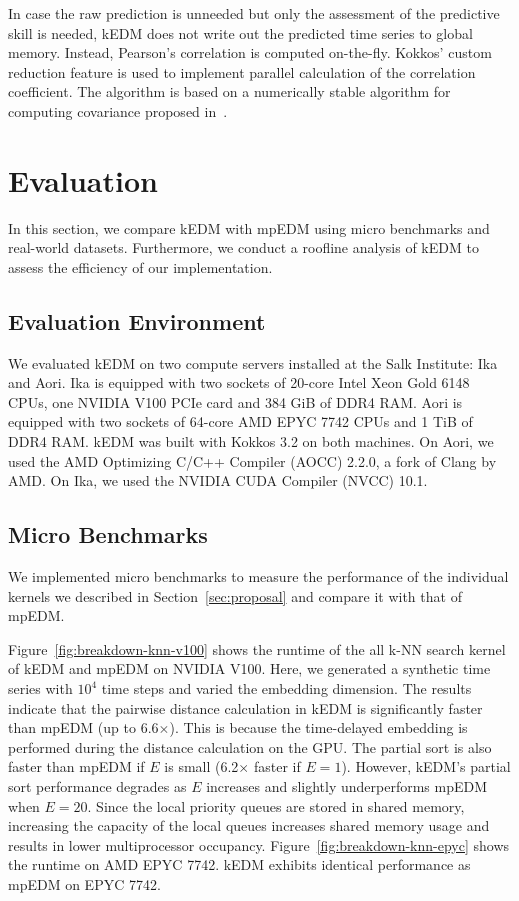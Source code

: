 \documentclass{acmart}
\begin{document}
In case the raw prediction is unneeded but only the assessment of the
predictive skill is needed, kEDM does not write out the predicted time series
to global memory. Instead, Pearson’s correlation is computed on-the-fly.
Kokkos’ custom reduction feature is used to implement parallel calculation of the
correlation coefficient. The algorithm is based on a numerically stable
algorithm for computing covariance proposed in~\cite{Schubert2018}.

\section{Evaluation}\label{sec:evaluation}

In this section, we compare kEDM with mpEDM using micro benchmarks and
real-world datasets. Furthermore, we conduct a roofline analysis of kEDM to
assess the efficiency of our implementation.

\subsection{Evaluation Environment}


We evaluated kEDM on two compute servers installed at the Salk Institute: Ika and Aori.
Ika is equipped with two sockets of 20-core Intel Xeon Gold
6148 CPUs, one NVIDIA V100 PCIe card and 384 GiB of DDR4 RAM\@. Aori is equipped with
two sockets of 64-core AMD EPYC 7742 CPUs and 1 TiB of DDR4 RAM\@. kEDM was built
with Kokkos 3.2 on both machines. On Aori, we used the AMD Optimizing C/C++
Compiler (AOCC) 2.2.0, a fork of Clang by AMD. On Ika, we used the NVIDIA CUDA
Compiler (NVCC) 10.1.

\subsection{Micro Benchmarks}

We implemented micro benchmarks to measure the performance of the individual
kernels we described in Section~\ref{sec:proposal} and compare it with that of
mpEDM\@.

Figure~\ref{fig:breakdown-knn-v100} shows the runtime of the all k-NN search kernel
of kEDM and mpEDM on NVIDIA V100. Here, we generated a synthetic time series with
$10^4$ time steps and varied the embedding dimension.
The results indicate that the pairwise
distance calculation in kEDM is significantly faster than mpEDM (up to
6.6$\times$). This is because the time-delayed embedding is performed during the distance
calculation on the GPU\@. The partial sort is also faster than mpEDM if $E$ is small 
(6.2$\times$ faster if $E=1$). However, kEDM's partial sort performance degrades as 
$E$ increases and  slightly underperforms mpEDM when $E=20$. Since the local 
priority queues are stored in shared memory, increasing the capacity of the local 
queues increases shared memory usage and results in lower multiprocessor occupancy.
Figure~\ref{fig:breakdown-knn-epyc} shows the runtime on AMD EPYC 7742. kEDM exhibits
identical performance as mpEDM on EPYC 7742.
\end{document}
